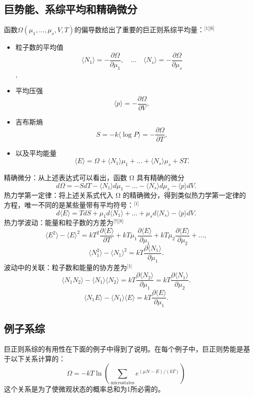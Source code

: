\subsection{巨势能、系综平均和精确微分}
函数\(\Omega(\mu_1,\dots,\mu_s,V,T)\)的偏导数给出了重要的巨正则系综平均量：\(^\text{[1][6]}\)
\begin{itemize}
\item 粒子数的平均值  
\[\langle N_1 \rangle = -\frac{\partial \Omega}{\partial \mu_1}, \quad \dots \quad \langle N_s \rangle = -\frac{\partial \Omega}{\partial \mu_s}~\],  
\item 平均压强  
\[\langle p \rangle = -\frac{\partial \Omega}{\partial V},~\]
\item 吉布斯熵  
\[S = -k \langle \log P \rangle = -\frac{\partial \Omega}{\partial T},~\]
\item 以及平均能量  
\[\langle E \rangle = \Omega + \langle N_1 \rangle \mu_1 + \dots + \langle N_s \rangle \mu_s + S T.~\]
\end{itemize}
精确微分：从上述表达式可以看出，函数 Ω 具有精确的微分
\[
d\Omega = -S dT - \langle N_1 \rangle d\mu_1 - \dots - \langle N_s \rangle d\mu_s - \langle p \rangle dV.~
\]
热力学第一定律：将上述关系式代入 Ω 的精确微分，得到类似热力学第一定律的方程，唯一不同的是某些量带有平均符号：\(^\text{[1]}\)
\[
d\langle E \rangle = T dS + \mu_1 d\langle N_1 \rangle + \dots + \mu_s d\langle N_s \rangle - \langle p \rangle dV.~
\]
热力学波动：能量和粒子数的方差为\(^\text{[7][8]}\)
\[
\langle E^2 \rangle - \langle E \rangle^2 = k T^2 \frac{\partial \langle E \rangle}{\partial T} + k T \mu_1 \frac{\partial \langle E \rangle}{\partial \mu_1} + k T \mu_2 \frac{\partial \langle E \rangle}{\partial \mu_2} + \dots ,~
\]
\[
\langle N_1^2 \rangle - \langle N_1 \rangle^2 = k T \frac{\partial \langle N_1 \rangle}{\partial \mu_1}.~
\]
波动中的关联：粒子数和能量的协方差为\(^\text{[1]}\)
\[
\langle N_1 N_2 \rangle - \langle N_1 \rangle \langle N_2 \rangle = k T \frac{\partial \langle N_2 \rangle}{\partial \mu_1} = k T \frac{\partial \langle N_1 \rangle}{\partial \mu_2}.~
\]
\[
\langle N_1 E \rangle - \langle N_1 \rangle \langle E \rangle = k T \frac{\partial \langle E \rangle}{\partial \mu_1}.~
\]
\subsection{例子系综}
巨正则系综的有用性在下面的例子中得到了说明。在每个例子中，巨正则势能是基于以下关系计算的：
\[
\Omega = -kT \ln \left( \sum_{\text{microstates}} e^{(\mu N - E)/(kT)}\right)~
\]
这个关系是为了使微观状态的概率总和为1所必需的。
